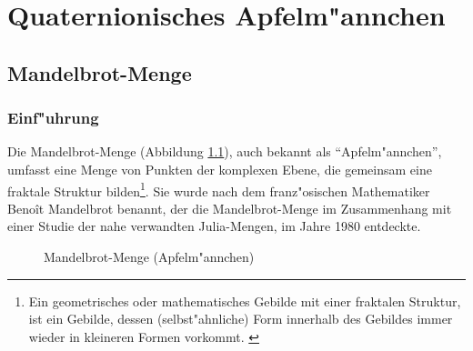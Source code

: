 \chapter{Quaternionisches Apfelm"annchen}
\begin{refsection}

\section{Mandelbrot-Menge}

\subsection{Einf"uhrung}
Die Mandelbrot-Menge (Abbildung \ref{fig. appleman}), auch bekannt als
``Apfelm"annchen'', umfasst eine Menge von Punkten der komplexen Ebene,
die gemeinsam eine fraktale Struktur bilden\footnote{Ein geometrisches
oder mathematisches Gebilde mit einer fraktalen Struktur, ist ein
Gebilde,  dessen (selbst"ahnliche) Form innerhalb des Gebildes immer
wieder in kleineren Formen vorkommt. \cite{fraktal}}. Sie wurde nach
dem franz"osischen Mathematiker Beno\^it Mandelbrot benannt, der die
Mandelbrot-Menge im Zusammenhang mit einer Studie der nahe verwandten
Julia-Mengen, im Jahre 1980 entdeckte. \cite{wiki}
\begin{figure}[ht!]\centering
\begin{adjustbox}{scale=0.45, keepaspectratio}
	
\end{adjustbox}
\caption{Mandelbrot-Menge (Apfelm"annchen)}
\label{fig. appleman}
\end{figure}


\end{refsection}
